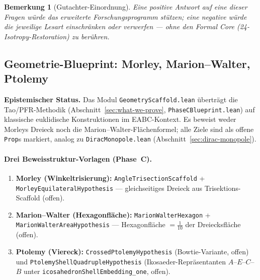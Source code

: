 \documentclass[11pt,a4paper]{article}
\newtheorem{remark}{Bemerkung}
\begin{document}
	\begin{remark}[Gutachter-Einordnung]
		Eine positive Antwort auf eine dieser Fragen würde das erweiterte
		Forschungsprogramm stützen; eine negative würde die jeweilige Lesart
		einschränken oder verwerfen --- \emph{ohne} den Formal Core
		(24-Isotropy-Restoration) zu berühren.
	\end{remark}
	
	\subsection{Geometrie-Blueprint: Morley, Marion--Walter, Ptolemy}
	\label{sec:geometry-scaffold}
	
	\textbf{Epistemischer Status.}
	Das Modul \texttt{GeometryScaffold.lean} überträgt die Tao/PFR-Methodik
	(Abschnitt~\ref{sec:what-we-prove}, \texttt{PhaseCBlueprint.lean}) auf
	klassische euklidische Konstruktionen im EABC-Kontext.
	Es beweist weder Morleys Dreieck noch die Marion--Walter-Flächenformel;
	alle Ziele sind als offene \texttt{Prop}s markiert, analog zu
	\texttt{DiracMonopole.lean} (Abschnitt~\ref{sec:dirac-monopole}).
	
	\paragraph{Drei Beweisstruktur-Vorlagen (Phase~C).}
	\begin{enumerate}
		\item \textbf{Morley (Winkeltrisierung):}
		\texttt{AngleTrisectionScaffold} + \texttt{MorleyEquilateralHypothesis} ---
		gleichseitiges Dreieck aus Trisektions-Scaffold (offen).
		\item \textbf{Marion--Walter (Hexagonfläche):}
		\texttt{MarionWalterHexagon} + \texttt{MarionWalterAreaHypothesis} ---
		Hexagonfläche $=\tfrac{1}{10}$ der Dreiecksfläche (offen).
		\item \textbf{Ptolemy (Viereck):}
		\texttt{CrossedPtolemyHypothesis} (Bowtie-Variante, offen) und
		\texttt{PtolemyShellQuadrupleHypothesis} (Ikosaeder-Repräsentanten
		$A$--$E$--$C$--$B$ unter \texttt{icosahedronShellEmbedding\_one}, offen).
	\end{enumerate}
	
\end{document}
